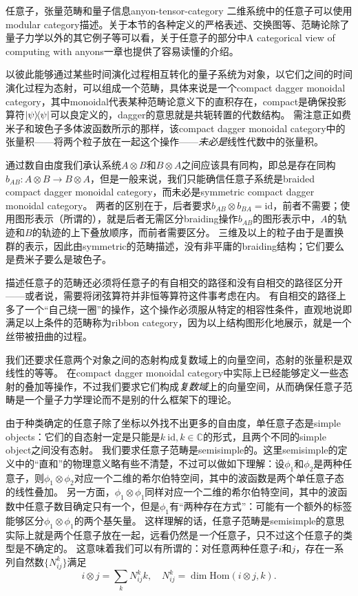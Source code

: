 \begin{back}{任意子，张量范畴和量子信息}{anyon-tensor-category}
    二维系统中的任意子可以使用modular category描述。关于本节的各种定义的严格表述、交换图等、范畴论除了量子力学以外的其它例子等可以看\cite{beer2018categories}，关于任意子的部分\cite{new_structures}中A categorical view of computing with anyons一章也提供了容易读懂的介绍。
    
    以彼此能够通过某些时间演化过程相互转化的量子系统为对象，以它们之间的时间演化过程为态射，可以组成一个范畴，具体来说是一个compact dagger monoidal category，其中monoidal代表某种范畴论意义下的直积存在，compact是确保投影算符$\dyad{\psi}$可以良定义的，dagger的意思就是共轭转置的代数结构。
    需注意正如费米子和玻色子多体波函数所示的那样，该compact dagger monoidal category中的张量积——将两个粒子放在一起这个操作——\emph{未必是}线性代数中的张量积。

    通过数自由度我们承认系统$A \otimes B$和$B \otimes A$之间应该具有同构，即总是存在同构$b_{AB} :A \otimes B \to B \otimes A$，但是一般来说，我们只能确信任意子系统是braided compact dagger monoidal category，而未必是symmetric compact dagger monoidal category。
    两者的区别在于，后者要求$b_{AB} \otimes b_{BA} = \mathrm{id}$，前者不需要；使用图形表示（所谓的），就是后者无需区分braiding操作$b_{AB}$的图形表示中，$A$的轨迹和$B$的轨迹的上下叠放顺序，而前者需要区分。
    三维及以上的粒子由于是置换群的表示，因此由symmetric的范畴描述，没有非平庸的braiding结构；它们要么是费米子要么是玻色子。

    描述任意子的范畴还必须将任意子的有自相交的路径和没有自相交的路径区分开——或者说，需要将闭弦算符并非恒等算符这件事考虑在内。
    有自相交的路径上多了一个“自己绕一圈”的操作，这个操作必须服从特定的相容性条件，直观地说即 %
    满足以上条件的范畴称为ribbon category，因为以上结构图形化地展示，就是一个丝带被扭曲的过程。

    我们还要求任意两个对象之间的态射构成复数域上的向量空间，态射的张量积是双线性的等等。
    在compact dagger monoidal category中实际上已经能够定义一些态射的叠加等操作，不过我们要求它们构成\emph{复数域}上的向量空间，从而确保任意子范畴是一个量子力学理论而不是别的什么框架下的理论。

    由于种类确定的任意子除了坐标以外找不出更多的自由度，单任意子态是simple objects：它们的自态射一定是只能是$k \  \mathrm{id}, k \in \mathbb{C}$的形式，且两个不同的simple object之间没有态射。
    我们要求任意子范畴是semisimple的。这里semisimple的定义中的“直和”的物理意义略有些不清楚，不过可以做如下理解：设$\phi_1$和$\phi_2$是两种任意子，则$\phi_1 \otimes \phi_2$对应一个二维的希尔伯特空间，其中的波函数是两个单任意子态的线性叠加。
    另一方面，$\phi_1 \otimes \phi_1$同样对应一个二维的希尔伯特空间，其中的波函数中任意子数目确定只有一个，但是$\phi_1$有“两种存在方式”：可能有一个额外的标签能够区分$\phi_1 \otimes \phi_1$的两个基矢量。
    这样理解的话，任意子范畴是semisimple的意思实际上就是两个任意子放在一起，远看仍然是\emph{一个}任意子，只不过这个任意子的类型是不确定的。
    这意味着我们可以有所谓的：对任意两种任意子$i$和$j$，存在一系列自然数$\{N_{ij}^k\}$满足
    \begin{equation}
        i \otimes j = \sum_k N_{ij}^k k, \quad N_{ij}^k = \dim \mathrm{Hom}(i \otimes j, k).
    \end{equation}


\end{back}
